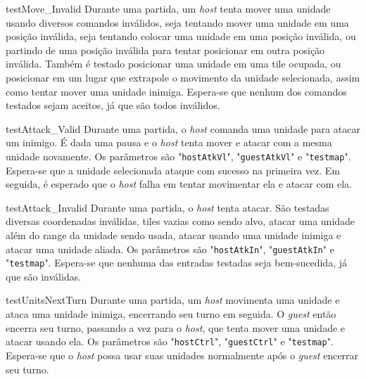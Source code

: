 \begin{itemise}
\teste
    {testMove\_Invalid}
    {Durante uma partida, um \emph{host} tenta mover uma unidade usando diversos
    comandos inválidos, seja tentando mover uma unidade em uma posição inválida,
    seja tentando colocar uma unidade em uma posição inválida, ou partindo de uma
    posição inválida para tentar posicionar em outra posição inválida. Também é
    testado posicionar uma unidade em uma tile ocupada, ou posicionar em um lugar
    que extrapole o movimento da unidade selecionada, assim como tentar mover
    uma unidade inimiga.}
    {Espera-se que nenhum dos comandos testados sejam aceitos, já que são todos
    inválidos.}

\teste
    {testAttack\_Valid}
    {Durante uma partida, o \emph{host} comanda uma unidade para atacar um inimigo.
    É dada uma pausa e o \emph{host} tenta mover e atacar com a mesma unidade
    novamente. Os parâmetros são "\texttt{hostAtkVl}", "\texttt{guestAtkVl}" e
    "\texttt{testmap}".}
    {Espera-se que a unidade selecionada ataque com sucesso na primeira vez.
    Em seguida, é esperado que o \emph{host} falha em tentar movimentar ela e
    atacar com ela.}

\teste
    {testAttack\_Invalid}
    {Durante uma partida, o \emph{host} tenta atacar. São testadas diversas
    coordenadas inválidas, tiles vazias como sendo alvo, atacar uma unidade além do
    range da unidade sendo usada, atacar usando uma unidade inimiga e atacar uma
    unidade aliada. Os parâmetros são "\texttt{hostAtkIn}", "\texttt{guestAtkIn}" e
    "\texttt{testmap}".}
    {Espera-se que nenhuma das entradas testadas seja bem-sucedida, já que são
    inválidas.}

\teste
    {testUnitsNextTurn}
    {Durante uma partida, um \emph{host} movimenta uma unidade e ataca uma unidade
    inimiga, encerrando seu turno em seguida. O \emph{guest} então encerra seu turno,
    passando a vez para o \emph{host}, que tenta mover uma unidade e atacar usando
    ela. Os parâmetros são "\texttt{hostCtrl}", "\texttt{guestCtrl}" e
    "\texttt{testmap}".}
    {Espera-se que o \emph{host} possa usar suas unidades normalmente após o
    \emph{guest} encerrar seu turno.}



\end{itemise}

